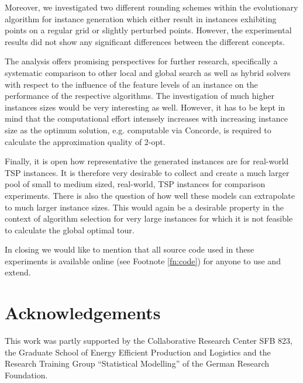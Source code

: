 \documentclass{article}
\begin{document}
Moreover, we investigated two different rounding schemes within the
evolutionary algorithm for instance generation which either result in
instances exhibiting points on a regular grid or slightly perturbed
points. However, the experimental results did not show any significant
differences between the different concepts.

The analysis offers promising perspectives for further research,
specifically a systematic comparison to other local and global search
as well as hybrid solvers with respect to the influence of the feature
levels of an instance on the performance of the respective algorithms.
The investigation of much higher instances sizes would be very
interesting as well. However, it has to be kept in mind that the
computational effort intensely increases with increasing instance size
as the optimum solution, e.g. computable via Concorde, is required to
calculate the approximation quality of $2$-opt.

Finally, it is open how representative the generated instances are for
real-world TSP instances. It is therefore very desirable to collect
and create a much larger pool of small to medium sized, real-world,
TSP instances for comparison experiments. There is also the question
of how well these models can extrapolate to much larger instance
sizes. This would again be a desirable property in the context of
algorithm selection for very large instances for which it is not
feasible to calculate the global optimal tour.

In closing we would like to mention that all source code used in these experiments is available online (see Footnote \ref{fn:code}) for anyone to use and extend.



\section*{Acknowledgements}
  This work was partly supported by the Collaborative Research Center
  SFB 823, the Graduate School of Energy Efficient Production and
  Logistics and the Research Training Group ``Statistical Modelling''
  of the German Research Foundation.



\end{document}
